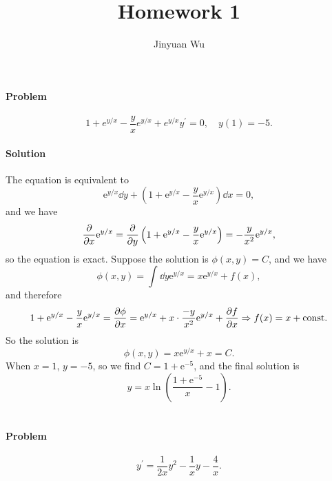 \documentclass[hyperref, a4paper]{article}
\title{Homework 1}
\author{Jinyuan Wu}
\newcommand*{\ee}{\mathrm{e}}
\newcommand*{\const}{\mathrm{const}}
\begin{document}
\maketitle

\section{}

\paragraph*{Problem} \begin{equation}
    1+e^{y / x}-\frac{y}{x} e^{y / x}+e^{y / x} y^{\prime}=0 , \quad  y(1)=-5.
\end{equation}

\paragraph*{Solution} The equation is equivalent to 
\[
    \ee^{y/x} \dd{y} + 
    \left(
        1 + \ee^{y/x} - \frac{y}{x} \ee^{y/x} 
    \right) \dd{x} = 0,
\]
and we have 
\[
    \pdv{x} \ee^{y/x} = \pdv{y} \left(
        1 + \ee^{y/x} - \frac{y}{x} \ee^{y/x} 
    \right) = - \frac{y}{x^2} \ee^{y/x},
\]
so the equation is exact. 
Suppose the solution is $\phi(x, y) = C$, and we have 
\[
    \phi(x, y) = \int \dd{y} \ee^{y/x} = x \ee^{y/x} + f(x),
\] 
and therefore 
\[
    1 + \ee^{y/x} - \frac{y}{x} \ee^{y/x}  = \pdv{\phi}{x} 
    = \ee^{y/x} + x \cdot \frac{-y}{x^2} \ee^{y/x} + \pdv{f}{x}
    \Rightarrow f(x) = x + \const.  
\]
So the solution is 
\begin{equation}
    \phi(x, y) = x \ee^{y/x} + x = C. 
\end{equation}
When $x = 1$, $y = -5$, 
so we find $C = 1 + \ee^{-5}$,
and the final solution is 
\begin{equation}
    y = x \ln \left(
        \frac{1 + \ee^{-5}}{x} - 1
    \right).
\end{equation}

\section{}

\paragraph*{Problem} \begin{equation}
    y^{\prime}=\frac{1}{2 x} y^2-\frac{1}{x} y-\frac{4}{x}.
\end{equation}
\end{document}
